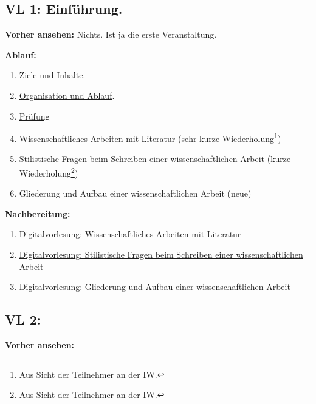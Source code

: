 \documentclass[a4paper]{article}%
\begin{document}
\subsection{VL 1: Einführung. }

\textbf{Vorher ansehen:} Nichts. Ist ja die erste Veranstaltung. 

\bigskip

\textbf{Ablauf:}
\begin{enumerate}
\item \hyperref[ZieleUndInhalte]{Ziele und Inhalte}.
\item \hyperref[OrganisationUndAblauf]{Organisation und Ablauf}.
\item \hyperref[Prüfung]{Prüfung}
\item Wissenschaftliches Arbeiten mit Literatur (sehr kurze Wiederholung\footnote{Aus Sicht der Teilnehmer an der IW.})
\item Stilistische Fragen beim Schreiben einer wissenschaftlichen Arbeit (kurze Wiederholung\footnote{Aus Sicht der Teilnehmer an der IW.})
\item Gliederung und Aufbau einer wissenschaftlichen Arbeit (neue)
\end{enumerate}

\bigskip

\textbf{Nachbereitung:}
\begin{enumerate}
\item \hyperlink{Digitalvorlesung}{Digitalvorlesung: Wissenschaftliches Arbeiten mit Literatur}
\item \hyperlink{Digitalvorlesung}{Digitalvorlesung: Stilistische Fragen beim Schreiben einer wissenschaftlichen Arbeit}
\item \hyperlink{Digitalvorlesung}{Digitalvorlesung: Gliederung und Aufbau einer wissenschaftlichen Arbeit}
\end{enumerate}



\clearpage
\subsection{VL 2: } 


\textbf{Vorher ansehen:}
\end{document}
